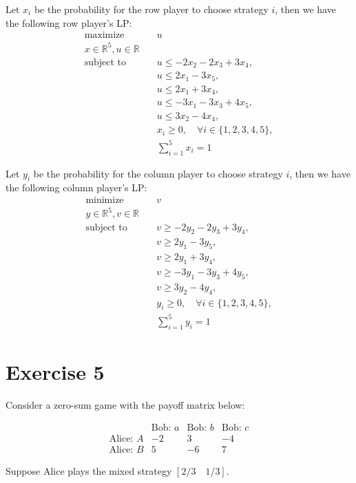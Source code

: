 \documentclass{article}
\begin{document}
Let $x_i$ be the probability for the row player to choose strategy $i$, then we have the following row player's LP:
\begin{align*}
\text{maximize} & \quad u \\
x \in \mathbb{R}^5, u \in \mathbb{R} & \\
\text{subject to} & \quad u \leq -2x_2 - 2x_3 + 3x_4, \\
& \quad u \leq 2x_1 - 3x_5, \\
& \quad u \leq 2x_1 + 3x_4, \\
& \quad u \leq -3x_1 - 3x_3 + 4x_5, \\
& \quad u \leq 3x_2 - 4x_4, \\
& \quad x_i \geq 0, \quad \forall i \in \{1,2,3,4,5\}, \\
& \quad \sum_{i=1}^5 x_i = 1
\end{align*}

Let $y_i$ be the probability for the column player to choose strategy $i$, then we have the following column player's LP:
\begin{align*}
\text{minimize} & \quad v \\
y \in \mathbb{R}^5, v \in \mathbb{R} & \\
\text{subject to} & \quad v \geq -2y_2 - 2y_3 + 3y_4, \\
& \quad v \geq 2y_1 - 3y_5, \\
& \quad v \geq 2y_1 + 3y_4, \\
& \quad v \geq -3y_1 - 3y_3 + 4y_5, \\
& \quad v \geq 3y_2 - 4y_4, \\
& \quad y_i \geq 0, \quad \forall i \in \{1,2,3,4,5\}, \\
& \quad \sum_{i=1}^5 y_i = 1
\end{align*}

\newpage

\section*{Exercise 5}
Consider a zero-sum game with the payoff matrix below:

$$\begin{array}{c|ccc}
& \text{Bob: } a & \text{Bob: } b & \text{Bob: } c \\
\hline
\text{Alice: } A & -2 & 3 & -4 \\
\text{Alice: } B & 5 & -6 & 7
\end{array}$$

Suppose Alice plays the mixed strategy $\left[2/3 \quad 1/3\right]$. \\
\end{document}

